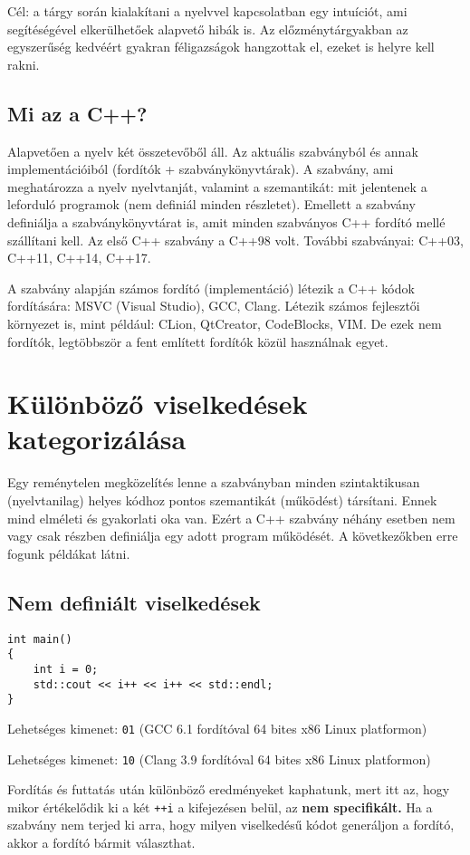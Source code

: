 \documentclass[a4paper,11.5pt,table]{article}
\begin{document}
	\medskip
	Cél: a tárgy során kialakítani a nyelvvel kapcsolatban egy intuíciót, ami segítéségével elkerülhetőek alapvető hibák is. Az előzménytárgyakban az egyszerűség kedvéért gyakran féligazságok hangzottak el, ezeket is helyre kell rakni.
	\subsection{Mi az a C++?}
  Alapvetően a nyelv két összetevőből áll. Az aktuális szabványból és annak implementációiból (fordítók + szabványkönyvtárak). A szabvány, ami meghatározza a nyelv nyelvtanját, valamint a szemantikát: mit jelentenek a leforduló programok (nem definiál minden részletet). Emellett a szabvány definiálja a szabványkönyvtárat is, amit minden szabványos C++ fordító mellé szállítani kell. Az első C++ szabvány a {C++98} volt. További szabványai: {C++03}, {C++11}, {C++14}, {C++17}.
	
	\medskip
  A szabvány alapján számos fordító (implementáció) létezik a C++ kódok fordítására: MSVC (Visual Studio), GCC, Clang.
  Létezik számos fejlesztői környezet is, mint például: CLion, QtCreator, CodeBlocks, VIM. De ezek nem fordítók, legtöbbször a fent említett fordítók közül használnak egyet.
  \section{Különböző viselkedések kategorizálása} 

  Egy reménytelen megközelítés lenne a szabványban minden szintaktikusan (nyelvtanilag) helyes kódhoz pontos szemantikát (működést) társítani. Ennek mind elméleti és gyakorlati oka van. Ezért a C++ szabvány néhány esetben nem vagy csak részben definiálja egy adott program működését. A következőkben erre fogunk példákat látni.

	\subsection{Nem definiált viselkedések}
	\begin{lstlisting}
int main()
{
	int i = 0;
	std::cout << i++ << i++ << std::endl;
}
	\end{lstlisting}
  Lehetséges kimenet: \texttt{01} (GCC 6.1 fordítóval 64 bites x86 Linux platformon)
	
	Lehetséges kimenet: \texttt{10} (Clang 3.9 fordítóval 64 bites x86 Linux platformon)
	\medskip
	
	Fordítás és futtatás után különböző eredményeket kaphatunk, mert itt az, hogy mikor értékelődik ki a két \texttt{++i} a kifejezésen belül, az \textbf{nem specifikált.} Ha a szabvány nem terjed ki arra, hogy milyen viselkedésű kódot generáljon a fordító, akkor a fordító bármit választhat. 
	\medskip
	
\end{document}

